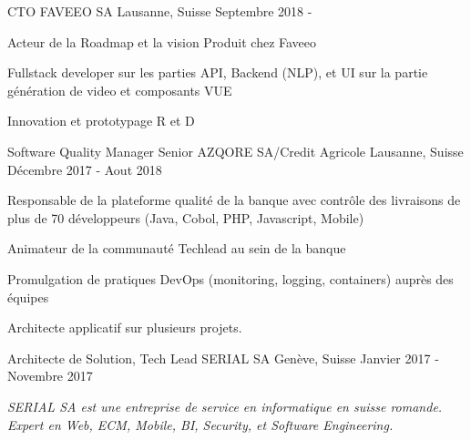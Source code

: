 

\begin{cventries}
\cventry
{CTO} %
{FAVEEO SA} %
{Lausanne, Suisse} %
{Septembre 2018 - } %
{
    \begin{cvitems} %
        \item {Acteur de la Roadmap et la vision Produit chez Faveeo}
        \item {Fullstack developer sur les parties API, Backend (NLP), et UI sur la partie génération de video et composants VUE}
        \item {Innovation et prototypage R et D}        
    \end{cvitems}
}%
\cventry
{Software Quality Manager Senior} %
{AZQORE SA/Credit Agricole} %
{Lausanne, Suisse} %
{Décembre 2017 - Aout 2018} %
{
    \begin{cvitems} %
        \item {Responsable de la plateforme qualité de la banque avec contrôle des livraisons de plus de 70 développeurs (Java, Cobol, PHP, Javascript, Mobile)}
        \item {Animateur de la communauté Techlead au sein de la banque}        
        \item {Promulgation de pratiques DevOps (monitoring, logging, containers) auprès des équipes}        
        \item {Architecte applicatif sur plusieurs projets.}                
    \end{cvitems}
}%
\cventry
{Architecte de Solution, Tech Lead} %
{SERIAL SA} %
{Genève, Suisse} %
{Janvier 2017 - Novembre 2017 } %
{
	\begin{cvitems} %
		\item {\textit{SERIAL SA est une entreprise de service en informatique en suisse romande. Expert en Web, ECM, Mobile, BI, Security, et Software Engineering.}}

\end{cvitems}}
\end{cventries}
